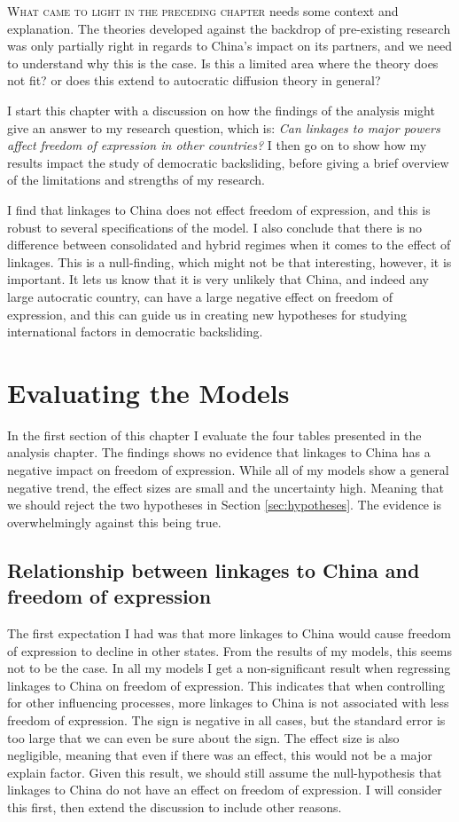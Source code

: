 \lettrine{W}{hat came to light in the preceding chapter} needs some context and explanation. The theories developed against the backdrop of pre-existing research was only partially right in regards to China's impact on its partners, and we need to understand why this is the case. Is this a limited area where the theory does not fit? or does this extend to autocratic diffusion theory in general?

I start this chapter with a discussion on how the findings of the analysis might give an answer to my research question, which is: \textit{Can linkages to major powers affect freedom of expression in other countries?} I then go on to show how my results impact the study of democratic backsliding, before giving a brief overview of the limitations and strengths of my research. 

I find that linkages to China does not effect freedom of expression, and this is robust to several specifications of the model. I also conclude that there is no difference between consolidated and hybrid regimes when it comes to the effect of linkages. This is a null-finding, which might not be that interesting, however, it is important. It lets us know that it is very unlikely that China, and indeed any large autocratic country, can have a large negative effect on freedom of expression, and this can guide us in creating new hypotheses for studying international factors in democratic backsliding. 

\section{Evaluating the Models}
In the first section of this chapter I evaluate the four tables presented in the analysis chapter. The findings shows no evidence that linkages to China has a negative impact on freedom of expression. While all of my models show a general negative trend, the effect sizes are small and the uncertainty high. Meaning that we should reject the two hypotheses in Section \ref{sec:hypotheses}. The evidence is overwhelmingly against this being true. 

\subsection{Relationship between linkages to China and freedom of expression}
The first expectation I had was that more linkages to China would cause freedom of expression to decline in other states. From the results of my models, this seems not to be the case. In all my models  I get a non-significant result when regressing linkages to China on freedom of expression. This indicates that when controlling for other influencing processes, more linkages to China is not associated with less freedom of expression. The sign is negative in all cases, but the standard error is too large that we can even be sure about the sign. The effect size is also negligible, meaning that even if there was an effect, this would not be a major explain factor. Given this result, we should still assume the null-hypothesis that linkages to China do not have an effect on freedom of expression. I will consider this first, then extend the discussion to include other reasons. 

